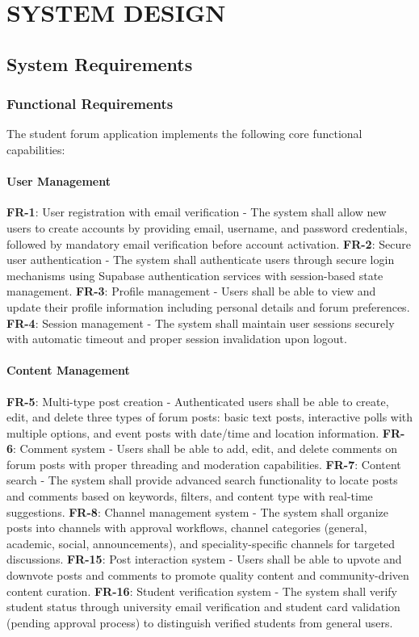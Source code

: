 \chapter{SYSTEM DESIGN}

\section{System Requirements}

\subsection{Functional Requirements}

The student forum application implements the following core functional capabilities:

\subsubsection{User Management}

 \textbf{FR-1}: User registration with email verification - The system shall allow new users to create accounts by providing email, username, and password credentials, followed by mandatory email verification before account activation.
     \textbf{FR-2}: Secure user authentication - The system shall authenticate users through secure login mechanisms using Supabase authentication services with session-based state management.
     \textbf{FR-3}: Profile management - Users shall be able to view and update their profile information including personal details and forum preferences.
     \textbf{FR-4}: Session management - The system shall maintain user sessions securely with automatic timeout and proper session invalidation upon logout.

\subsubsection{Content Management}

     \textbf{FR-5}: Multi-type post creation - Authenticated users shall be able to create, edit, and delete three types of forum posts: basic text posts, interactive polls with multiple options, and event posts with date/time and location information.
     \textbf{FR-6}: Comment system - Users shall be able to add, edit, and delete comments on forum posts with proper threading and moderation capabilities.
     \textbf{FR-7}: Content search - The system shall provide advanced search functionality to locate posts and comments based on keywords, filters, and content type with real-time suggestions.
     \textbf{FR-8}: Channel management system - The system shall organize posts into channels with approval workflows, channel categories (general, academic, social, announcements), and speciality-specific channels for targeted discussions.
     \textbf{FR-15}: Post interaction system - Users shall be able to upvote and downvote posts and comments to promote quality content and community-driven content curation.
     \textbf{FR-16}: Student verification system - The system shall verify student status through university email verification and student card validation (pending approval process) to distinguish verified students from general users.


